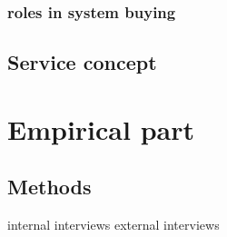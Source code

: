 \documentclass[12pt,a4paper,oneside,pdftex]{report}
\begin{document}
\subsection{roles in system buying}






\section{Service concept}

% 

\chapter{Empirical part}
\label{chapter:methods}
\section{Methods}

internal interviews
external interviews
\end{document}
